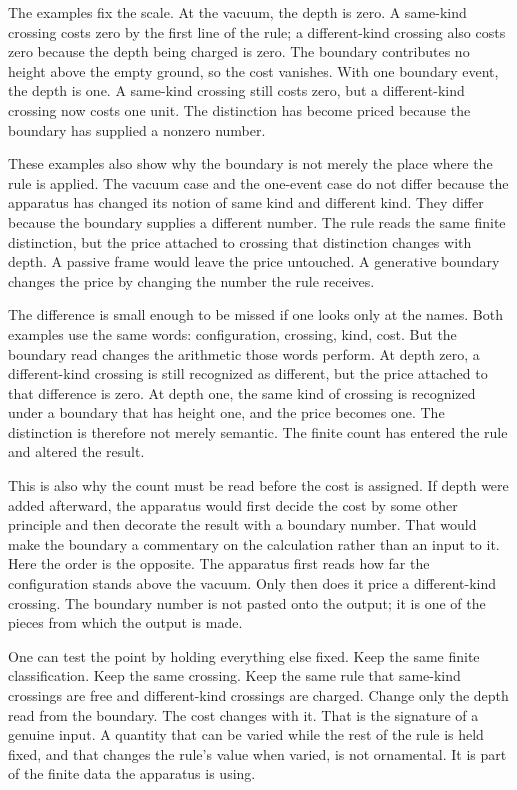 The examples fix the scale. At the vacuum, the depth is zero. A same-kind crossing
costs zero by the first line of the rule; a different-kind crossing also costs zero
because the depth being charged is zero. The boundary contributes no height above the
empty ground, so the cost vanishes. With one boundary event, the depth is one. A
same-kind crossing still costs zero, but a different-kind crossing now costs one
unit. The distinction has become priced because the boundary has supplied a nonzero
number.

These examples also show why the boundary is not merely the place where the rule is
applied. The vacuum case and the one-event case do not differ because the apparatus
has changed its notion of same kind and different kind. They differ because the
boundary supplies a different number. The rule reads the same finite distinction, but
the price attached to crossing that distinction changes with depth. A passive frame
would leave the price untouched. A generative boundary changes the price by changing
the number the rule receives.

The difference is small enough to be missed if one looks only at the names. Both
examples use the same words: configuration, crossing, kind, cost. But the boundary
read changes the arithmetic those words perform. At depth zero, a different-kind
crossing is still recognized as different, but the price attached to that difference
is zero. At depth one, the same kind of crossing is recognized under a boundary that
has height one, and the price becomes one. The distinction is therefore not merely
semantic. The finite count has entered the rule and altered the result.

This is also why the count must be read before the cost is assigned. If depth were
added afterward, the apparatus would first decide the cost by some other principle
and then decorate the result with a boundary number. That would make the boundary a
commentary on the calculation rather than an input to it. Here the order is the
opposite. The apparatus first reads how far the configuration stands above the
vacuum. Only then does it price a different-kind crossing. The boundary number is
not pasted onto the output; it is one of the pieces from which the output is made.

One can test the point by holding everything else fixed. Keep the same finite
classification. Keep the same crossing. Keep the same rule that same-kind crossings
are free and different-kind crossings are charged. Change only the depth read from
the boundary. The cost changes with it. That is the signature of a genuine input. A
quantity that can be varied while the rest of the rule is held fixed, and that
changes the rule's value when varied, is not ornamental. It is part of the finite
data the apparatus is using.


